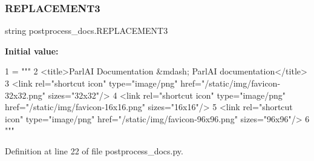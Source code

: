 \subsubsection{\texorpdfstring{R\+E\+P\+L\+A\+C\+E\+M\+E\+N\+T3}{REPLACEMENT3}}
{\footnotesize\ttfamily string postprocess\+\_\+docs.\+R\+E\+P\+L\+A\+C\+E\+M\+E\+N\+T3}

{\bfseries Initial value\+:}
\begin{DoxyCode}
1 =  \textcolor{stringliteral}{"""}
2 \textcolor{stringliteral}{<title>ParlAI Documentation &mdash; ParlAI  documentation</title>}
3 \textcolor{stringliteral}{<link rel="shortcut icon" type="image/png" href="/static/img/favicon-32x32.png" sizes="32x32"/>}
4 \textcolor{stringliteral}{<link rel="shortcut icon" type="image/png" href="/static/img/favicon-16x16.png" sizes="16x16"/>}
5 \textcolor{stringliteral}{<link rel="shortcut icon" type="image/png" href="/static/img/favicon-96x96.png" sizes="96x96"/>}
6 \textcolor{stringliteral}{"""}
\end{DoxyCode}


Definition at line 22 of file postprocess\+\_\+docs.\+py.

